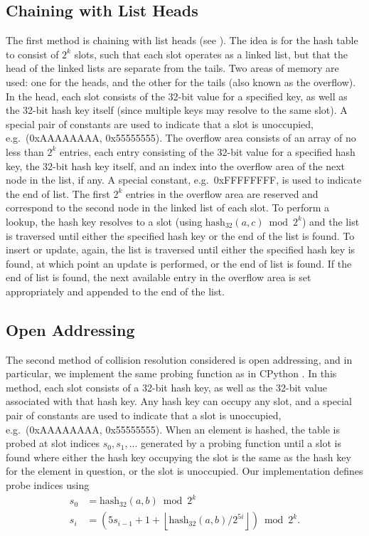 \documentclass{ucalgthes1}
\theoremstyle{definition}
\newcommand{\floor}[1]{\left\lfloor #1 \right\rfloor}
\newcommand{\hash}{\textrm{hash}_{\textrm{32}}}
\begin{document}
\subsection{Chaining with List Heads}
The first method is chaining with list heads (see \cite[Subsection~11.2]{Cormen2001}).  The idea is for the hash table to consist of $2^k$ slots, such that each slot operates as a linked list, but that the head of the linked lists are separate from the tails.  Two areas of memory are used: one for the heads, and the other for the tails (also known as the overflow).  In the head, each slot consists of the 32-bit value for a specified key, as well as the 32-bit hash key itself (since multiple keys may resolve to the same slot).  A special pair of constants are used to indicate that a slot is unoccupied, e.g.\ (0xAAAAAAAA, 0x55555555).  The overflow area consists of an array of no less than $2^k$ entries, each entry consisting of the 32-bit value for a specified hash key, the 32-bit hash key itself, and an index into the overflow area of the next node in the list, if any.  A special constant, e.g.\ 0xFFFFFFFF, is used to indicate the end of list.  The first $2^k$ entries in the overflow area are reserved and correspond to the second node in the linked list of each slot.  To perform a lookup, the hash key resolves to a slot (using $\hash(a, c) \bmod 2^k$) and the list is traversed until either the specified hash key or the end of the list is found.  To insert or update, again, the list is traversed until either the specified hash key is found, at which point an update is performed, or the end of list is found.  If the end of list is found, the next available entry in the overflow area is set appropriately and appended to the end of the list. 

\subsection{Open Addressing}
\label{subsec:openAddressing}

The second method of collision resolution considered is open addressing, and in particular, we implement the same probing function as in CPython \cite{Kuchling2008}.  In this method, each slot consists of a 32-bit hash key, as well as the 32-bit value associated with that hash key.  Any hash key can occupy any slot, and a special pair of constants are used to indicate that a slot is unoccupied, e.g.\ (0xAAAAAAAA, 0x55555555).   When an element is hashed, the table is probed at slot indices $s_0, s_1, ...$ generated by a probing function until a slot is found where either the hash key occupying the slot is the same as the hash key for the element in question, or the slot is unoccupied.  Our implementation defines probe indices using
\begin{align*}
	s_0 &= \hash(a,b) \bmod 2^k \\
	s_i &= \left( 5s_{i-1} + 1 + \floor{\hash(a,b)/2^{5i}} \right) \bmod 2^k.
\end{align*}
\end{document}
